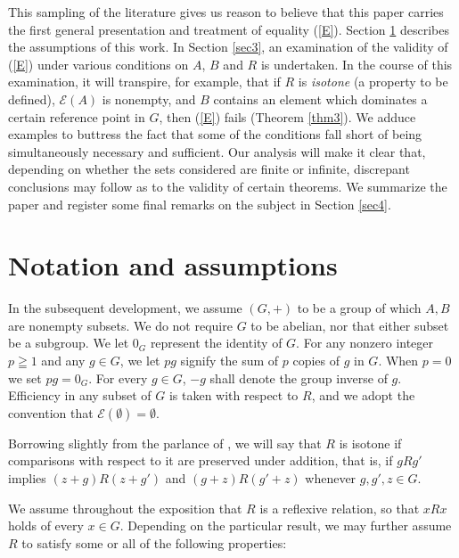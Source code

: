 \documentclass[pdflatex,sn-apa,11pt]{sn-jnl}%
\begin{document}
This sampling of the literature gives us reason to believe that this paper carries the first general presentation and treatment of equality (\ref{E}). Section \ref{sec2} describes the assumptions of this work. In Section \ref{sec3}, an examination of the validity of (\ref{E}) under various conditions on $A$, $B$ and $R$ is undertaken. In the course of this examination, it will transpire, for example, that if $R$ is \textit{isotone} (a property to be defined), $\mathscr{E}(A)$ is nonempty, and $B$ contains an element which dominates a certain reference point in $G$, then (\ref{E}) fails (Theorem \ref{thm3}). We adduce examples to buttress the fact that some of the conditions fall short of being simultaneously necessary and sufficient. Our analysis will make it clear that, depending on whether the sets considered are finite or infinite, discrepant conclusions may follow as to the validity of certain theorems. %
We summarize the paper and register some final remarks on the subject in Section \ref{sec4}.     

\section{Notation and assumptions}\label{sec2}

In the subsequent development, we assume $(G, +)$ to be a group of which $A, B$ are nonempty subsets. We do not require $G$ to be abelian, nor that either subset be a subgroup. We let $0_{G}$ represent the identity of $G$. For any nonzero integer $p \geqq 1$ and any $g \in G$, we let $pg$ signify the sum of $p$ copies of $g$ in $G$. When $p = 0$ we set $pg = 0_{G}$. For every $g \in G$, $-g$ shall denote the group inverse of $g$. Efficiency in any subset of $G$ is taken with respect to $R$, and we adopt the convention that $\mathscr{E}(\emptyset) = \emptyset$.

Borrowing slightly from the parlance of \cite{MacLane1999-zu}, we will say that $R$ is isotone if comparisons with respect to it are preserved under addition, that is, if $gRg'$ implies $(z + g)R(z + g')$ and $(g+z)R(g'+z)$ whenever $g, g', z \in G$. 

We assume throughout the exposition that $R$ is a reflexive relation, so that $xRx$ holds of every $x \in G$. Depending on the particular result, we may further assume $R$ to satisfy some or all of the following properties:
\end{document}
